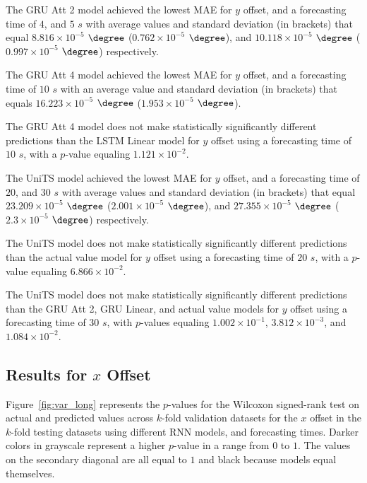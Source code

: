 The GRU Att 2 model achieved the lowest MAE for $y$ offset, and a forecasting time of $4$, and $5$ $s$ with average values and standard deviation (in brackets) that equal $8.816 \times 10^{-5}$ $\degree$ ($0.762 \times 10^{-5}$ $\degree$), and $10.118 \times 10^{-5}$ $\degree$ ($0.997 \times 10^{-5}$ $\degree$) respectively.

The GRU Att 4 model achieved the lowest MAE for $y$ offset, and a forecasting time of $10$ $s$ with an average value and standard deviation (in brackets) that equals $16.223 \times 10^{-5}$ $\degree$ ($1.953 \times 10^{-5}$ $\degree$).

The GRU Att 4 model does not make statistically significantly different predictions than the LSTM Linear model for $y$ offset using a forecasting time of $10$ $s$, with a $p$-value equaling $1.121 \times 10^{-2}$.

The UniTS model achieved the lowest MAE for $y$ offset, and a forecasting time of $20$, and $30$ $s$ with average values and standard deviation (in brackets) that equal $23.209 \times 10^{-5}$ $\degree$ ($2.001 \times 10^{-5}$ $\degree$), and $27.355 \times 10^{-5}$ $\degree$ ($2.3 \times 10^{-5}$ $\degree$) respectively.

The UniTS model does not make statistically significantly different predictions than the actual value model for $y$ offset using a forecasting time of $20$ $s$, with a $p$-value equaling $6.866 \times 10^{-2}$.

The UniTS model does not make statistically significantly different predictions than the GRU Att 2, GRU Linear, and actual value models for $y$ offset using a forecasting time of $30$ $s$, with $p$-values equaling $1.002 \times 10^{-1}$, $3.812 \times 10^{-3}$, and $1.084 \times 10^{-2}$.

\subsection{Results for $x$ Offset}

Figure~\ref{fig:var_long} represents the $p$-values for the Wilcoxon signed-rank test on actual and predicted values across $k$-fold validation datasets for the $x$ offset in the $k$-fold testing datasets using different RNN models, and forecasting times. Darker colors in grayscale represent a higher $p$-value in a range from $0$ to $1$. The values on the secondary diagonal are all equal to $1$ and black because models equal themselves.

